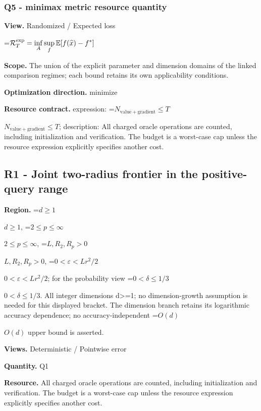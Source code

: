 \documentclass[10pt,a4paper]{article}
\newcommand{\AtlasMath}[1]{\par\begingroup\centering\setbox0=\hbox{$\displaystyle #1$}\ifdim\wd0>1.4\linewidth\typeout{ATLAS WIDE FORMULA: \the\wd0}\fi\ifdim\wd0>\linewidth\resizebox{\linewidth}{!}{\box0}\else\box0\fi\par\endgroup}
\newcommand{\AtlasInlineMath}[1]{\begingroup\setbox0=\hbox{$#1$}\ifdim\wd0>.4\linewidth\endgroup\AtlasMath{#1}\else\endgroup$#1$\fi}
\begin{document}
\subsubsection{Q5 - minimax metric resource quantity}


\textbf{View.} Randomized / Expected loss



\AtlasMath{\mathcal R_T^{\rm exp}=\inf_A\sup_f\mathbb E[f(\widehat x)-f^*]}


\textbf{Scope.} The union of the explicit parameter and dimension domains of the linked comparison regimes; each bound retains its own applicability conditions.



\textbf{Optimization direction.} minimize



\textbf{Resource contract.} expression: \AtlasInlineMath{N_{\mathrm{value+gradient}}\le T}; description: All charged oracle operations are counted, including initialization and verification. The budget is a worst-case cap unless the resource expression explicitly specifies another cost.



\subsection{R1 - Joint two-radius frontier in the positive-query range}


\textbf{Region.} \AtlasInlineMath{d\ge1}, \AtlasInlineMath{2\le p\le\infty}, \AtlasInlineMath{L,R_2,R_p>0}, \AtlasInlineMath{0<\varepsilon<Lr^2/2}; for the probability view \AtlasInlineMath{0<\delta\le1/3}. All integer dimensions d>=1; no dimension-growth assumption is needed for this displayed bracket. The dimension branch retains its logarithmic accuracy dependence; no accuracy-independent \AtlasInlineMath{O(d)} upper bound is asserted.



\textbf{Views.} Deterministic / Pointwise error



\textbf{Quantity.} Q1



\textbf{Resource.} All charged oracle operations are counted, including initialization and verification. The budget is a worst-case cap unless the resource expression explicitly specifies another cost.
\end{document}
